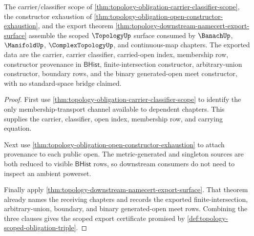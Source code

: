 \begin{theorem}
\label{thm:topology-obligation-downstream-export-certificate}
The carrier/classifier scope of \autoref{thm:topology-obligation-carrier-classifier-scope}, the constructor exhaustion of \autoref{thm:topology-obligation-open-constructor-exhaustion}, and the export theorem \autoref{thm:topology-downstream-namecert-export-surface} assemble the scoped $\TopologyUp$ surface consumed by $\BanachUp$, $\ManifoldUp$, $\ComplexTopologyUp$, and continuous-map chapters. The exported data are the carrier, carrier classifier, carried-open index, membership row, constructor provenance in $\mathsf{BHist}$, finite-intersection constructor, arbitrary-union constructor, boundary rows, and the binary generated-open meet constructor, with no standard-space bridge claimed.
\end{theorem}
\begin{proof}
First use \autoref{thm:topology-obligation-carrier-classifier-scope} to identify the only membership-transport channel available to dependent chapters. This supplies the carrier, classifier, open index, membership row, and carrying equation.

Next use \autoref{thm:topology-obligation-open-constructor-exhaustion} to attach provenance to each public open. The metric-generated and singleton sources are both reduced to visible $\mathsf{BHist}$ rows, so downstream consumers do not need to inspect an ambient powerset.

Finally apply \autoref{thm:topology-downstream-namecert-export-surface}. That theorem already names the receiving chapters and records the exported finite-intersection, arbitrary-union, boundary, and binary generated-open meet rows. Combining the three clauses gives the scoped export certificate promised by \autoref{def:topology-scoped-obligation-triple}.
\end{proof}
